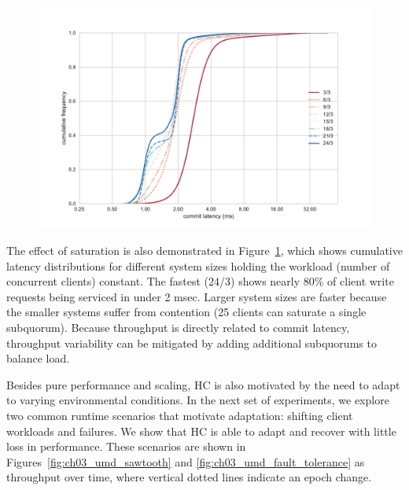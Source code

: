 \begin{figure}
    \begin{center}
        \includegraphics[width=5in]{figures/ch03_ec2_latency_cumfreq.pdf}
    \end{center}
    \renewcommand{\baselinestretch}{1}
    \small\normalsize

    \begin{quote}
        \caption[HC Cumulative Latency Distribution]{}
        \label{fig:ch03_ec2_latency_cumfreq}
    \end{quote}
\end{figure}
\renewcommand{\baselinestretch}{2}
\small\normalsize

The effect of saturation is also demonstrated in Figure~\ref{fig:ch03_ec2_latency_cumfreq}, which shows cumulative latency distributions for different system sizes holding the  workload (number of concurrent clients) constant.
The fastest (24/3) shows nearly 80\% of client write requests being serviced in under 2 msec.
Larger system sizes are faster because the smaller systems suffer from contention (25 clients can saturate a single subquorum).
Because throughput is directly related to commit latency, throughput variability can be mitigated by adding additional subquorums to balance load.

Besides pure performance and scaling, HC is also motivated by the need to adapt to varying environmental conditions.
In the next set of experiments, we explore two common runtime scenarios that motivate adaptation: shifting client workloads and failures.
We show that HC is able to adapt and recover with little loss in performance. These scenarios are shown in Figures~\ref{fig:ch03_umd_sawtooth} and \ref{fig:ch03_umd_fault_tolerance} as throughput over time, where vertical dotted lines indicate an epoch change.

